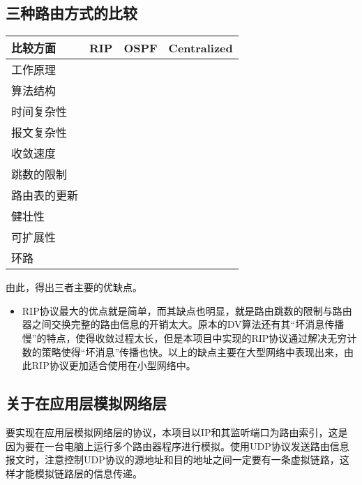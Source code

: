 \documentclass[15pt]{ctexart}
\begin{document}
	\subsection{三种路由方式的比较} %
	\label{sub:三种路由方式的比较}
		\begin{table}[H]
			\begin{tabular}{|l|l|l|l|}
				\hline
				比较方面 & RIP & OSPF & Centralized \\
				\hline
				工作原理 &  &  &  \\
				\hline
				算法结构 &  &  &  \\
				\hline
				时间复杂性 &  &  &  \\
				\hline
				报文复杂性 &  &  &  \\
				\hline
				收敛速度 &  &  &  \\
				\hline
				跳数的限制 &  &  &  \\
				\hline
				路由表的更新 &  &  &  \\
				\hline
				健壮性 &  &  &  \\
				\hline
				可扩展性 &  &  &  \\
				\hline
				环路 &  &  &  \\
				\hline
			\end{tabular}
		\end{table}
		由此，得出三者主要的优缺点。
		\begin{itemize}
			\item RIP协议最大的优点就是简单，而其缺点也明显，就是路由跳数的限制与路由器之间交换完整的路由信息的开销太大。原本的DV算法还有其“坏消息传播慢”的特点，使得收敛过程太长，但是本项目中实现的RIP协议通过解决无穷计数的策略使得“坏消息”传播也快。以上的缺点主要在大型网络中表现出来，由此RIP协议更加适合使用在小型网络中。
		\end{itemize}
	\subsection{关于在应用层模拟网络层} %
	\label{sub:关于在应用层模拟网络层协议}
		要实现在应用层模拟网络层的协议，本项目以IP和其监听端口为路由索引，这是因为要在一台电脑上运行多个路由器程序进行模拟。使用UDP协议发送路由信息报文时，注意控制UDP协议的源地址和目的地址之间一定要有一条虚拟链路，这样才能模拟链路层的信息传递。
\end{document}
